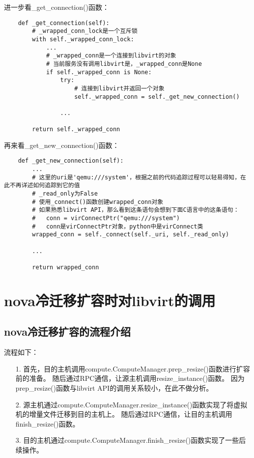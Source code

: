 \documentclass[a4paper,left=1.5cm,right=1.5cm,11pt]{article}
\begin{document}
	进一步看\_get\_connection()函数：
	\begin{lstlisting}
	def _get_connection(self):
		# _wrapped_conn_lock是一个互斥锁
        with self._wrapped_conn_lock:
			...
			# _wrapped_conn是一个连接到libvirt的对象
            # 当前服务没有调用libvirt是，_wrapped_conn是None
            if self._wrapped_conn is None:
                try:
                    # 连接到libvirt并返回一个对象
                    self._wrapped_conn = self._get_new_connection()
                
				...

        return self._wrapped_conn
	\end{lstlisting}

	再来看\_get\_new\_connection()函数：
	\begin{lstlisting}
	def _get_new_connection(self):
        ...
		# 这里的uri是'qemu:///system'，根据之前的代码追踪过程可以轻易得知，在此不再详述如何追踪到它的值
		# _read_only为False
		# 使用_connect()函数创建wrapped_conn对象
		# 如果熟悉libvirt API，那么看到这条语句会想到下面C语言中的这条语句：
		#	conn = virConnectPtr("qemu:///system")
		#	conn是virConnectPtr对象，python中是virConnect类
        wrapped_conn = self._connect(self._uri, self._read_only)

        ...

        return wrapped_conn
	\end{lstlisting}


\clearpage

\section{nova冷迁移扩容时对libvirt的调用}
\subsection{nova冷迁移扩容的流程介绍}
	流程如下：
	\begin{itemize}
		\item[1.] 首先，目的主机调用compute.ComputeManager.prep\_resize()函数进行扩容前的准备。
				  随后通过RPC通信，让源主机调用resize\_instance()函数。
				  因为prep\_resize()函数与libvirt API的调用关系较小，在此不做分析。
		\item[2.] 源主机通过compute.ComputeManager.resize\_instance()函数实现了将虚拟机的增量文件迁移到目的主机上。
			      随后通过RPC通信，让目的主机调用finish\_resize()函数。
		\item[3.] 目的主机通过compute.ComputeManager.finish\_resize()函数实现了一些后续操作。
	\end{itemize}
\end{document}
